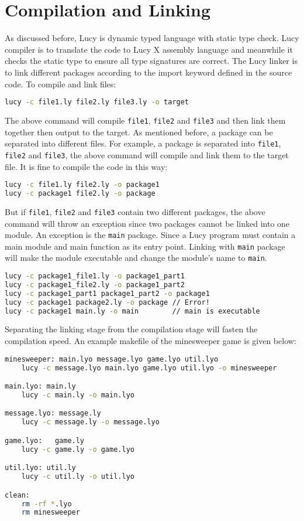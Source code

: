 \section{Compilation and Linking}
As discussed before, Lucy is dynamic typed language with static type check. Lucy compiler is to translate the code to Lucy X assembly language and meanwhile it checks the static type to ensure all type signatures are correct. The Lucy linker is to link different packages according to the import keyword defined in the source code. To compile and link files:
\begin{lstlisting}[language=bash]
lucy -c file1.ly file2.ly file3.ly -o target
\end{lstlisting}
The above command will compile \texttt{file1}, \texttt{file2} and \texttt{file3} and then link them together then output to the target. As mentioned before, a package can be separated into different files. For example, a package is separated into \texttt{file1}, \texttt{file2} and \texttt{file3}, the above command will compile and link them to the target file. It is fine to compile the code in this way:
\begin{lstlisting}[language=bash]
lucy -c file1.ly file2.ly -o package1
lucy -c package1 file2.ly -o package
\end{lstlisting}
But if \texttt{file1}, \texttt{file2} and \texttt{file3} contain two different packages, the above command will throw an exception since two packages cannot be linked into one module. An exception is the \texttt{main} package. Since a Lucy program must contain a main module and main function as its entry point. Linking with \texttt{main} package will make the module executable and change the module's name to \texttt{main}.
\begin{lstlisting}[language=bash]
lucy -c package1_file1.ly -o package1_part1
lucy -c package1_file2.ly -o package1_part2
lucy -c package1_part1 package1_part2 -o package1
lucy -c package1 package2.ly -o package // Error!
lucy -c package1 main.ly -o main        // main is executable
\end{lstlisting}
Separating the linking stage from the compilation stage will fasten the compilation speed. An example makefile of the minesweeper game is given below:
 \begin{lstlisting}[language=bash]
 minesweeper: main.lyo message.lyo game.lyo util.lyo
	lucy -c message.lyo main.lyo game.lyo util.lyo -o minesweeper

main.lyo: main.ly
	lucy -c main.ly -o main.lyo

message.lyo: message.ly
	lucy -c message.ly -o message.lyo

game.lyo:	game.ly
	lucy -c game.ly -o game.lyo

util.lyo: util.ly
	lucy -c util.ly -o util.lyo

clean:
	rm -rf *.lyo
	rm minesweeper
 \end{lstlisting}
